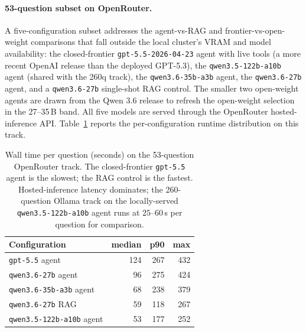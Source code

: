 \paragraph{53-question subset on OpenRouter.}
A five-configuration subset addresses the agent-vs-RAG and
frontier-vs-open-weight comparisons that fall outside the local
cluster's VRAM and model availability: the closed-frontier
\texttt{gpt-5.5-2026-04-23} agent with live tools (a more
recent OpenAI release than the deployed GPT-5.3), the
\texttt{qwen3.5-122b-a10b} agent (shared with the 260q track),
the \texttt{qwen3.6-35b-a3b} agent, the \texttt{qwen3.6-27b}
agent, and a \texttt{qwen3.6-27b} single-shot RAG control. The smaller two open-weight agents
are drawn from the Qwen 3.6 release to refresh the open-weight
selection in the 27--35\,B band. All five models are served
through the OpenRouter hosted-inference API.
Table~\ref{tab:runtime_53q} reports the per-configuration
runtime distribution on this track.

\begin{table}[htbp]
\centering
\caption{Wall time per question (seconds) on the 53-question
OpenRouter track. The closed-frontier \texttt{gpt-5.5} agent is
the slowest; the RAG control is the fastest. Hosted-inference latency dominates; the 260-question
Ollama track on the locally-served \texttt{qwen3.5-122b-a10b}
agent runs at $25$--$60$\,s per question for comparison.}
\label{tab:runtime_53q}
\begin{tabular}{@{}lrrr@{}}
\toprule
\textbf{Configuration} & \textbf{median} & \textbf{p90} & \textbf{max} \\
\midrule
\texttt{gpt-5.5} agent           & 124 &  267 & 432 \\
\texttt{qwen3.6-27b} agent       &  96 &  275 & 424 \\
\texttt{qwen3.6-35b-a3b} agent   &  68 &  238 & 379 \\
\texttt{qwen3.6-27b} RAG         &  59 &  118 & 267 \\
\texttt{qwen3.5-122b-a10b} agent &  53 &  177 & 252 \\
\bottomrule
\end{tabular}
\end{table}

